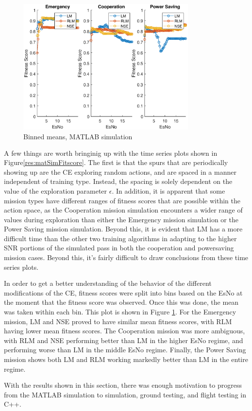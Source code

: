 \begin{figure}[!ht]
\centering
\includegraphics[width=0.8\textwidth]{figures/matlab_sim_results/binnedMeans_sim.eps}
\caption{Binned means, MATLAB simulation}
\label{res:matSimBinMean}
\end{figure}
\par A few things are worth bringinig up with the time series plots shown in Figure\ref{res:matSimFitscore}. The first is that the spurs that are periodically showing up are the CE exploring random actions, and are spaced in a manner independent of training type. Instead, the spacing is solely dependent on the value of the exploration parameter $\epsilon$. In addition, it is apparent that some mission types have different ranges of fitness scores that are possible within the action space, as the Cooperation mission simulation encounters a wider range of values during exploration than either the Emergency mission simulation or the Power Saving mission simulation. Beyond this, it is evident that LM has a more difficult time than the other two training algorithms in adapting to the higher SNR portions of the simulated pass in both the cooperation and powersaving mission cases. Beyond this, it's fairly difficult to draw conclusions from these time series plots.

\par In order to get a better understanding of the behavior of the different modifications of the CE, fitness scores were split into bins based on the EsNo at the moment that the fitness score was observed. Once this was done, the mean was taken within each bin. This plot is shown in Figure \ref{res:matSimBinMean}. For the Emergency mission, LM and NSE proved to have similar mean fitness scores, with RLM having lower mean fitness scores. The Cooperation mission was more ambiguous, with RLM and NSE performing better than LM in the higher EsNo regime, and performing worse than LM in the middle EsNo regime. Finally, the Power Saving mission shows both LM and RLM working markedly better than LM in the entire regime.
\par With the results shown in this section, there was enough motivation to progress from the MATLAB simulation to simulation, ground testing, and flight testing in C++. 
\clearpage
